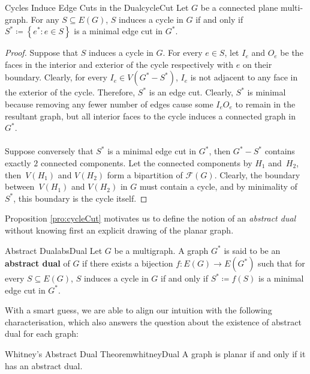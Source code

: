 \documentclass[math]{amznotes}
\theoremstyle{remark}
\begin{document}
\begin{probox}{Cycles Induce Edge Cuts in the Dual}{cycleCut}
    Let $G$ be a connected plane multi-graph. For any $S \subseteq E(G)$, $S$ induces a cycle in $G$ if and only if $S^* \coloneqq \left\{e^* \colon e \in S\right\}$ is a minimal edge cut in $G^*$.
    \tcblower
    \begin{proof}
        Suppose that $S$ induces a cycle in $G$. For every $e \in S$, let $I_e$ and $O_e$ be the faces in the interior and exterior of the cycle respectively with $e$ on their boundary. Clearly, for every $I_e \in V(G^* - S^*)$, $I_e$ is not adjacent to any face in the exterior of the cycle. Therefore, $S^*$ is an edge cut. Clearly, $S^*$ is minimal because removing any fewer number of edges cause some $I_eO_e$ to remain in the resultant graph, but all interior faces to the cycle induces a connected graph in $G^*$.
        \\\\
        Suppose conversely that $S^*$ is a minimal edge cut in $G^*$, then $G^* - S^*$ contains exactly $2$ connected components. Let the connected components by $H_1$ and~$H_2$, then~$V(H_1)$ and $V(H_2)$ form a bipartition of $\mathcal{F}(G)$. Clearly, the boundary between~$V(H_1)$ and $V(H_2)$ in $G$ must contain a cycle, and by minimality of $S^*$, this boundary is the cycle itself. 
    \end{proof}
\end{probox}
Proposition \ref{pro:cycleCut} motivates us to define the notion of an \textit{abstract dual} without knowing first an explicit drawing of the planar graph.
\begin{dfnbox}{Abstract Dual}{absDual}
    Let $G$ be a multigraph. A graph $G^*$ is said to be an {\color{red} \textbf{abstract dual}} of $G$ if there exists a bijection $f \colon E(G) \to E(G^*)$ such that for every $S \subseteq E(G)$, $S$ induces a cycle in $G$ if and only if $S^* \coloneqq f(S)$ is a minimal edge cut in $G^*$.
\end{dfnbox}
With a smart guess, we are able to align our intuition with the following characterisation, which also answers the question about the existence of abstract dual for each graph:
\begin{thmbox}{Whitney's Abstract Dual Theorem}{whitneyDual}
    A graph is planar if and only if it has an abstract dual.
\end{thmbox}
\end{document}
